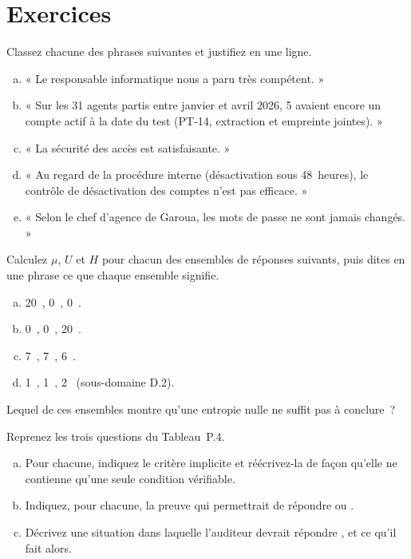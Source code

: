 \section*{Exercices}

\begin{boxexo}[title={\ding{45}\quad Exercice~P.1. Impression, constatation ou opinion~? \niveaubase}]
Classez chacune des phrases suivantes et justifiez en une ligne.
\begin{enumerate}[(a)]
    \item « Le responsable informatique nous a paru très compétent. »
    \item « Sur les 31 agents partis entre janvier et avril 2026, 5 avaient
          encore un compte actif à la date du test (PT-14, extraction et
          empreinte jointes). »
    \item « La sécurité des accès est satisfaisante. »
    \item « Au regard de la procédure interne (désactivation sous
          48~heures), le contrôle de désactivation des comptes n'est pas
          efficace. »
    \item « Selon le chef d'agence de Garoua, les mots de passe ne sont
          jamais changés. »
\end{enumerate}
\end{boxexo}

\begin{boxexo}[title={\ding{45}\quad Exercice~P.2. Trois mesures \niveaubase}]
Calculez $\mu$, $U$ et $H$ pour chacun des ensembles de réponses suivants,
puis dites en une phrase ce que chaque ensemble signifie.
\begin{enumerate}[(a)]
    \item 20~\OUI{}, 0~\NON{}, 0~\NEK{}.
    \item 0~\OUI{}, 0~\NON{}, 20~\NEK{}.
    \item 7~\OUI{}, 7~\NON{}, 6~\NEK{}.
    \item 1~\OUI{}, 1~\NON{}, 2~\NEK{} (sous-domaine D.2).
\end{enumerate}
Lequel de ces ensembles montre qu'une entropie nulle ne suffit pas à
conclure~?
\end{boxexo}

\begin{boxexo}[title={\ding{45}\quad Exercice~P.3. Réécrire trois questions \niveaumoyen}]
Reprenez les trois questions du Tableau~P.4.
\begin{enumerate}[(a)]
    \item Pour chacune, indiquez le critère implicite et réécrivez-la de
          façon qu'elle ne contienne qu'une seule condition vérifiable.
    \item Indiquez, pour chacune, la preuve qui permettrait de répondre
          \OUI{} ou \NON{}.
    \item Décrivez une situation dans laquelle l'auditeur devrait répondre
          \NEK{}, et ce qu'il fait alors.
\end{enumerate}
\end{boxexo}

